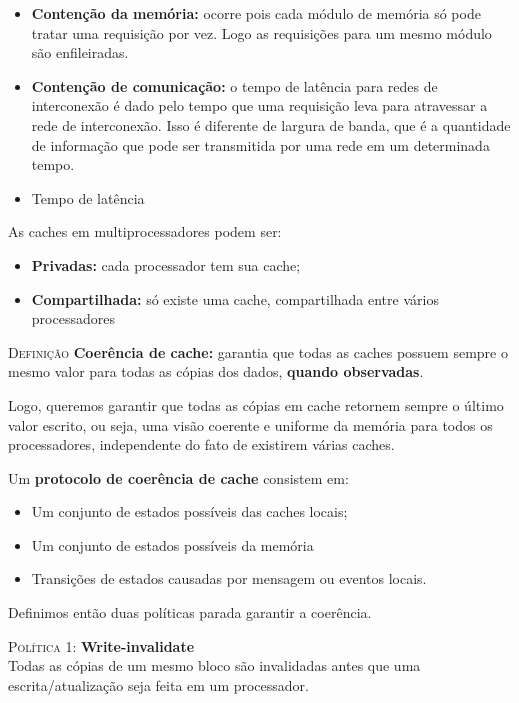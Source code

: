 \begin{itemize}
  \item \textbf{Contenção da memória:} ocorre pois cada módulo de memória só pode tratar uma requisição por vez. Logo as requisições para um mesmo módulo são enfileiradas.

  \item \textbf{Contenção de comunicação:} o tempo de latência para redes de interconexão é dado pelo tempo que uma requisição leva para atravessar a rede de interconexão. Isso é diferente de largura de banda, que é a quantidade de informação que pode ser transmitida por uma rede em um determinada tempo.

  \item Tempo de latência
\end{itemize}

As caches em multiprocessadores podem ser:
\begin{itemize}
  \item \textbf{Privadas:} cada processador tem sua cache;
  \item \textbf{Compartilhada:} só existe uma cache, compartilhada entre vários processadores
\end{itemize}

\textsc{Definição} \textbf{Coerência de cache:} garantia que todas as caches possuem sempre o mesmo valor para todas as cópias dos dados, \textbf{quando observadas}.

Logo, queremos garantir que todas as cópias em cache retornem sempre o último valor escrito, ou seja, uma visão coerente e uniforme da memória para todos os processadores, independente do fato de existirem várias caches.

Um \textbf{protocolo de coerência de cache} consistem em:
\begin{itemize}
  \item Um conjunto de estados possíveis das caches locais;
  \item Um conjunto de estados possíveis da memória
  \item Transições de estados causadas por mensagem ou eventos locais.
\end{itemize}




Definimos então duas políticas parada garantir a coerência.

\textsc{Política 1:} \textbf{Write-invalidate}\\
Todas as cópias de um mesmo bloco são invalidadas antes que uma escrita/atualização seja feita em um processador.

